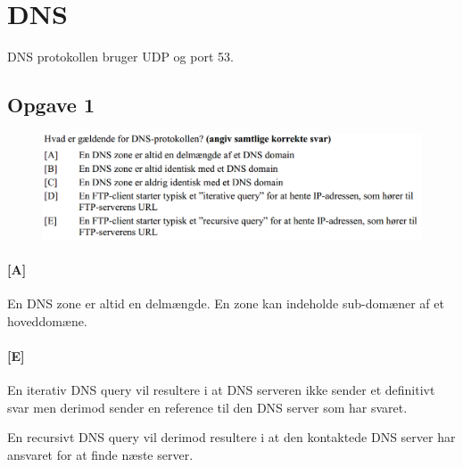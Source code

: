 \section{DNS}
DNS protokollen bruger UDP og port 53.

\subsection{Opgave 1}
\begin{figure}[H]
	\centering
	\includegraphics[width=\linewidth]{figs/dns/SE15OP2}
\end{figure}

\paragraph{[A]}
En DNS zone er altid en delmængde. En zone kan indeholde sub-domæner af et hoveddomæne.

\paragraph{[E]}
En iterativ DNS query vil resultere i at DNS serveren ikke sender et definitivt svar men derimod sender en reference til den DNS server som har svaret.

En recursivt DNS query vil derimod resultere i at den kontaktede DNS server har ansvaret for at finde næste server. 
